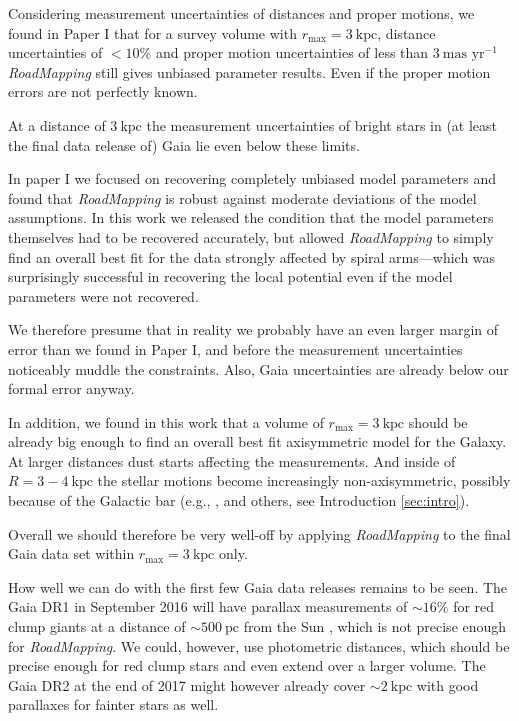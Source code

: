 \documentclass[iop,revtex4,numberedappendix,appendixfloats]{emulateapj}
\newcommand{\RM}{{\sl RoadMapping}}
\begin{document}
Considering measurement uncertainties of distances and proper motions, we found in Paper I that for a survey volume with $r_\text{max} = 3~\text{kpc}$, distance uncertainties of $<10\%$ and proper motion uncertainties of less than $3~\text{mas yr}^{-1}$ \RM{} still gives unbiased parameter results. Even if the proper motion errors are not perfectly known. 

At a distance of $3~\text{kpc}$ the measurement uncertainties of bright stars in (at least the final data release of) Gaia lie even below these limits. 

In paper I we focused on recovering completely unbiased model parameters and found that \RM{} is robust against moderate deviations of the model assumptions. In this work we released the condition that the model parameters themselves had to be recovered accurately, but allowed \RM{} to simply find an overall best fit for the data strongly affected by spiral arms---which was surprisingly successful in recovering the local potential even if the model parameters were not recovered. 

We therefore presume that in reality we probably have an even larger margin of error than we found in Paper I, and before the measurement uncertainties noticeably muddle the constraints. Also, Gaia uncertainties are already below our formal error anyway.

In addition, we found in this work that a volume of $r_\text{max} = 3~\text{kpc}$ should be already big enough to find an overall best fit axisymmetric model for the Galaxy. At larger distances dust starts affecting the measurements. And inside of $R=3-4~\text{kpc}$ the stellar motions become increasingly non-axisymmetric, possibly because  of the Galactic bar (e.g., \citealt{2014ApJ...783..130R,2015ApJ...800...83B}, and others, see Introduction \ref{sec:intro}).

Overall we should therefore be very well-off by applying \RM{} to the final Gaia data set within $r_\text{max}=3~\text{kpc}$ only.

How well we can do with the first few Gaia data releases remains to be seen. The Gaia DR1 in September 2016 will have parallax measurements of $\sim16\%$ for red clump giants at a distance of $\sim 500~\text{pc}$ from the Sun \citep{2014EAS....67...23D,2015A&A...574A.115M}, which is not precise enough for \RM{}. We could, however, use photometric distances, which should be precise enough for red clump stars and even extend over a larger volume. The Gaia DR2 at the end of 2017 might however already cover $\sim 2~\text{kpc}$ with good parallaxes for fainter stars as well.
\end{document}

